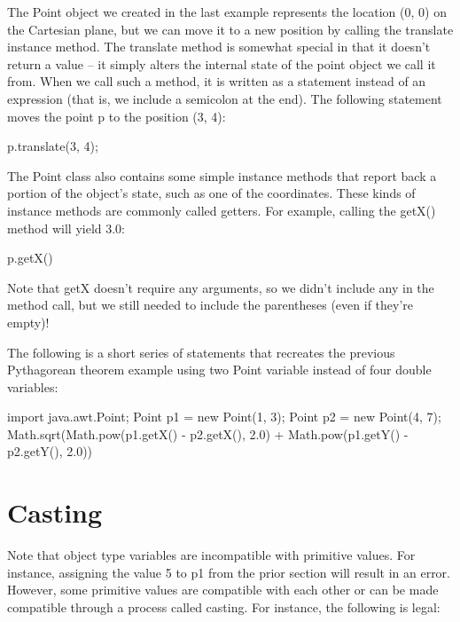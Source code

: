 \begin{exa}
The Point object we created in the last example represents the location (0, 0) on the Cartesian plane, but we can move it to a new position by calling the translate instance method. The translate method is somewhat special in that it doesn't return a value -- it simply alters the internal state of the point object we call it from. When we call such a method, it is written as a statement instead of an expression (that is, we include a semicolon at the end). The following statement moves the point p to the position (3, 4):

\begin{code}
p.translate(3, 4);
\end{code}

The Point class also contains some simple instance methods that report back a portion of the object's state, such as one of the coordinates. These kinds of instance methods are commonly called getters. For example, calling the getX() method will yield 3.0:

\begin{code}
p.getX()
\end{code}

Note that getX doesn't require any arguments, so we didn't include any in the method call, but we still needed to include the parentheses (even if they're empty)!

\end{exa}

\begin{exa}
The following is a short series of statements that recreates the previous Pythagorean theorem example using two Point variable instead of four double variables:

\begin{code}
import java.awt.Point;
Point p1 = new Point(1, 3);
Point p2 = new Point(4, 7);
Math.sqrt(Math.pow(p1.getX() - p2.getX(), 2.0) + Math.pow(p1.getY() - p2.getY(), 2.0))
\end{code}

\end{exa}


\section{Casting}

Note that object type variables are incompatible with primitive values. For instance, assigning the value 5 to p1 from the prior section will result in an error. However, some primitive values are compatible with each other or can be made compatible through a process called casting. For instance, the following is legal:

